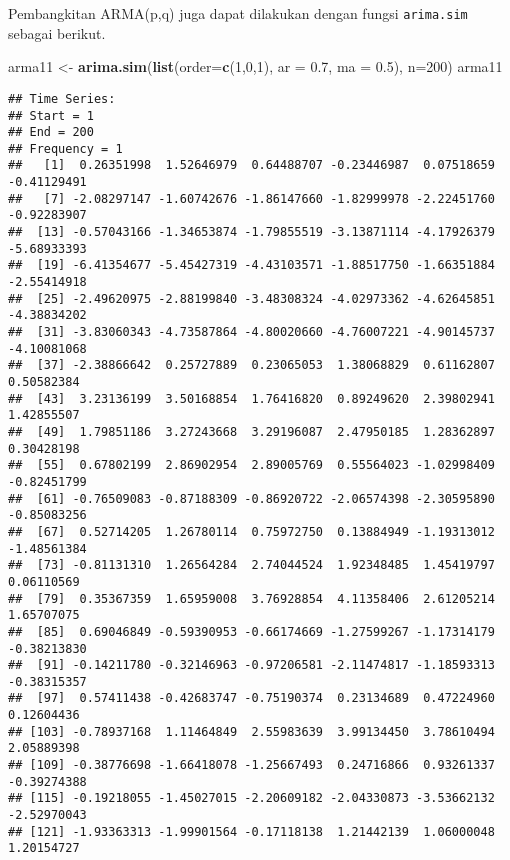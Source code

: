 \documentclass[
]{article}
\newenvironment{Shaded}{\begin{snugshade}}{\end{snugshade}}
\newcommand{\AttributeTok}[1]{\textcolor[rgb]{0.13,0.29,0.53}{#1}}
\newcommand{\DecValTok}[1]{\textcolor[rgb]{0.00,0.00,0.81}{#1}}
\newcommand{\FloatTok}[1]{\textcolor[rgb]{0.00,0.00,0.81}{#1}}
\newcommand{\FunctionTok}[1]{\textcolor[rgb]{0.13,0.29,0.53}{\textbf{#1}}}
\newcommand{\NormalTok}[1]{#1}
\newcommand{\OtherTok}[1]{\textcolor[rgb]{0.56,0.35,0.01}{#1}}
\begin{document}
Pembangkitan ARMA(p,q) juga dapat dilakukan dengan fungsi
\texttt{arima.sim} sebagai berikut.

\begin{Shaded}
\begin{Highlighting}[]
\NormalTok{arma11 }\OtherTok{\textless{}{-}} \FunctionTok{arima.sim}\NormalTok{(}\FunctionTok{list}\NormalTok{(}\AttributeTok{order=}\FunctionTok{c}\NormalTok{(}\DecValTok{1}\NormalTok{,}\DecValTok{0}\NormalTok{,}\DecValTok{1}\NormalTok{), }\AttributeTok{ar =} \FloatTok{0.7}\NormalTok{, }\AttributeTok{ma =} \FloatTok{0.5}\NormalTok{), }\AttributeTok{n=}\DecValTok{200}\NormalTok{)}
\NormalTok{arma11}
\end{Highlighting}
\end{Shaded}

\begin{verbatim}
## Time Series:
## Start = 1 
## End = 200 
## Frequency = 1 
##   [1]  0.26351998  1.52646979  0.64488707 -0.23446987  0.07518659 -0.41129491
##   [7] -2.08297147 -1.60742676 -1.86147660 -1.82999978 -2.22451760 -0.92283907
##  [13] -0.57043166 -1.34653874 -1.79855519 -3.13871114 -4.17926379 -5.68933393
##  [19] -6.41354677 -5.45427319 -4.43103571 -1.88517750 -1.66351884 -2.55414918
##  [25] -2.49620975 -2.88199840 -3.48308324 -4.02973362 -4.62645851 -4.38834202
##  [31] -3.83060343 -4.73587864 -4.80020660 -4.76007221 -4.90145737 -4.10081068
##  [37] -2.38866642  0.25727889  0.23065053  1.38068829  0.61162807  0.50582384
##  [43]  3.23136199  3.50168854  1.76416820  0.89249620  2.39802941  1.42855507
##  [49]  1.79851186  3.27243668  3.29196087  2.47950185  1.28362897  0.30428198
##  [55]  0.67802199  2.86902954  2.89005769  0.55564023 -1.02998409 -0.82451799
##  [61] -0.76509083 -0.87188309 -0.86920722 -2.06574398 -2.30595890 -0.85083256
##  [67]  0.52714205  1.26780114  0.75972750  0.13884949 -1.19313012 -1.48561384
##  [73] -0.81131310  1.26564284  2.74044524  1.92348485  1.45419797  0.06110569
##  [79]  0.35367359  1.65959008  3.76928854  4.11358406  2.61205214  1.65707075
##  [85]  0.69046849 -0.59390953 -0.66174669 -1.27599267 -1.17314179 -0.38213830
##  [91] -0.14211780 -0.32146963 -0.97206581 -2.11474817 -1.18593313 -0.38315357
##  [97]  0.57411438 -0.42683747 -0.75190374  0.23134689  0.47224960  0.12604436
## [103] -0.78937168  1.11464849  2.55983639  3.99134450  3.78610494  2.05889398
## [109] -0.38776698 -1.66418078 -1.25667493  0.24716866  0.93261337 -0.39274388
## [115] -0.19218055 -1.45027015 -2.20609182 -2.04330873 -3.53662132 -2.52970043
## [121] -1.93363313 -1.99901564 -0.17118138  1.21442139  1.06000048  1.20154727

\end{verbatim}
\end{document}
